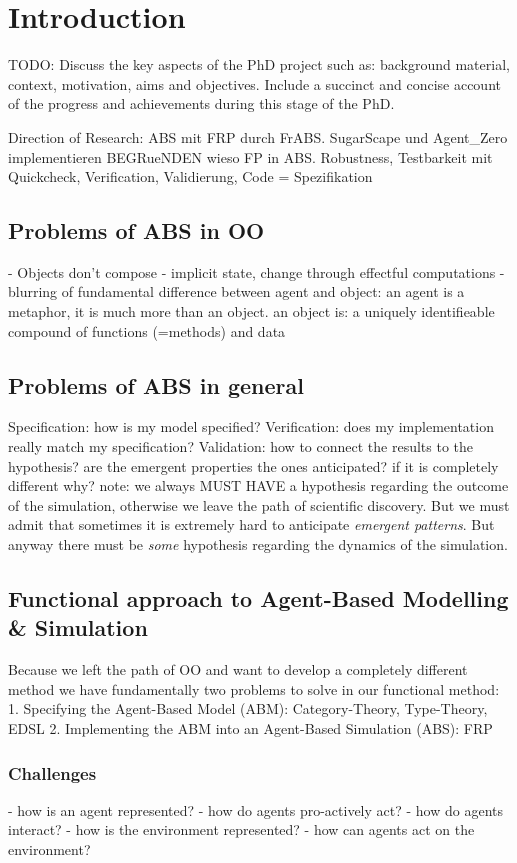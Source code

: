 \section{Introduction}
TODO: Discuss the key aspects of the PhD project such as: background material, context, motivation, aims and objectives. Include a succinct and concise account of the progress and achievements during this stage of the PhD.

Direction of Research:
ABS mit FRP durch FrABS. SugarScape und Agent\_Zero implementieren
BEGRueNDEN wieso FP in ABS. Robustness, Testbarkeit mit Quickcheck, Verification, Validierung, Code = Spezifikation

\subsection{Problems of ABS in OO}
- Objects don't compose
- implicit state, change through effectful computations
- blurring of fundamental difference between agent and object: an agent is a metaphor, it is much more than an object. an object is: a uniquely identifieable compound of functions (=methods) and data

\subsection{Problems of ABS in general}
Specification: how is my model specified? 
Verification: does my implementation really match my specification? 
Validation: how to connect the results to the hypothesis? are the emergent properties the ones anticipated? if it is completely different why? note: we always MUST HAVE a hypothesis regarding the outcome of the simulation, otherwise we leave the path of scientific discovery. But we must admit that sometimes it is extremely hard to anticipate \textit{emergent patterns}. But anyway there must be \textit{some} hypothesis regarding the dynamics of the simulation.



\subsection{Functional approach to Agent-Based Modelling \& Simulation}
Because we left the path of OO and want to develop a completely different method we have fundamentally two problems to solve in our functional method:
1. Specifying the Agent-Based Model (ABM): Category-Theory, Type-Theory, EDSL
2. Implementing the ABM into an Agent-Based Simulation (ABS): FRP

\subsubsection{Challenges}
- how is an agent represented?
- how do agents pro-actively act?
- how do agents interact?
- how is the environment represented?
- how can agents act on the environment?